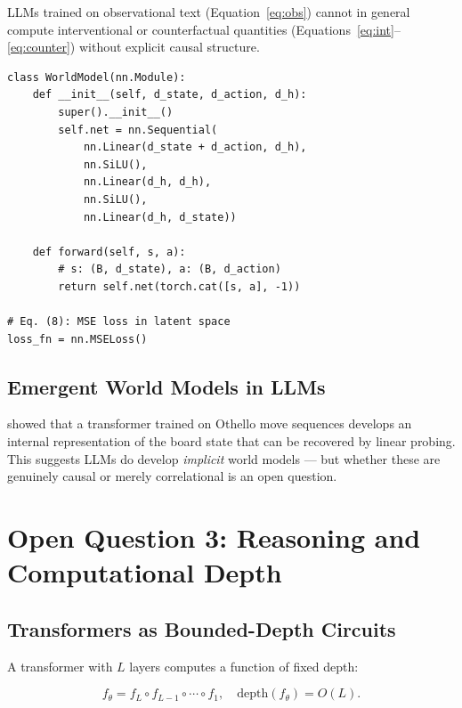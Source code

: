 \documentclass[10pt,twocolumn]{article}
\begin{document}
\noindent LLMs trained on observational text (Equation~\ref{eq:obs})
cannot in general compute interventional or counterfactual quantities
(Equations~\ref{eq:int}--\ref{eq:counter}) without explicit causal
structure.

\begin{lstlisting}[caption={Simple world model in PyTorch.}]
class WorldModel(nn.Module):
    def __init__(self, d_state, d_action, d_h):
        super().__init__()
        self.net = nn.Sequential(
            nn.Linear(d_state + d_action, d_h),
            nn.SiLU(),
            nn.Linear(d_h, d_h),
            nn.SiLU(),
            nn.Linear(d_h, d_state))

    def forward(self, s, a):
        # s: (B, d_state), a: (B, d_action)
        return self.net(torch.cat([s, a], -1))

# Eq. (8): MSE loss in latent space
loss_fn = nn.MSELoss()
\end{lstlisting}

\subsection{Emergent World Models in LLMs}

\citet{li2023emergent} showed that a transformer trained on Othello move
sequences develops an internal representation of the board state that
can be recovered by linear probing.  This suggests LLMs do develop
\emph{implicit} world models — but whether these are genuinely
causal or merely correlational is an open question.

\section{Open Question 3: Reasoning and Computational Depth}
\label{sec:reasoning}

\subsection{Transformers as Bounded-Depth Circuits}

A transformer with $L$ layers computes a function of fixed depth:

\begin{equation}
  f_\theta = f_L \circ f_{L-1} \circ \cdots \circ f_1,
  \quad \text{depth}(f_\theta) = O(L).
  \label{eq:depth}
\end{equation}
\end{document}
